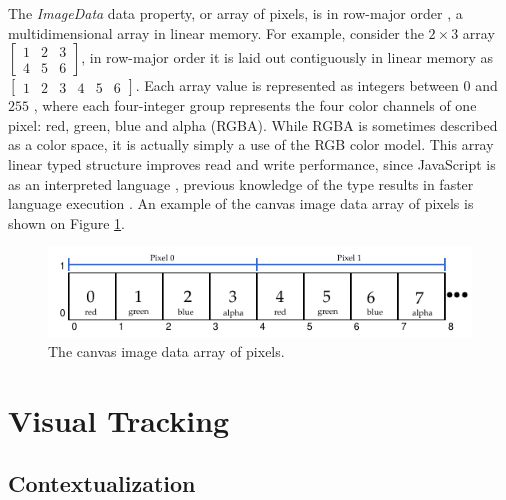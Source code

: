 The \textit{ImageData} data property, or array of pixels, is in row-major order \cite{Canvas2013,MDN2013}, a multidimensional array in linear memory. For example, consider the $2\times3$ array $\begin{bmatrix}
1 & 2 & 3\\
4 & 5 & 6
\end{bmatrix}$, in row-major order it is laid out contiguously in linear memory as $\begin{bmatrix}
1 & 2 & 3 & 4 & 5 & 6
\end{bmatrix}$. Each array value is represented as integers between $0$ and $255$ \cite{Canvas2013,MDN2013}, where each four-integer group represents the four color channels of one pixel: red, green, blue and alpha (RGBA). While RGBA \cite{Gonzalez2007} is sometimes described as a color space, it is actually simply a use of the RGB \cite{Gonzalez2007} color model. This array linear typed structure improves read and write performance, since JavaScript \cite{International2009} is as an interpreted language \cite{International2009,MDN2013}, previous knowledge of the type results in faster language execution \cite{TypedArray2013,MDN2013}. An example of the canvas \cite{Canvas2013} image data array of pixels is shown on Figure \ref{figure:imagedata_array}.

\begin{figure}[!htb]
  \centering
  \includegraphics[width=\linewidth]{chapters/basic_concepts/imagedata_array.pdf}
  \caption{The canvas image data array of pixels.}
  \label{figure:imagedata_array}
\end{figure}



\section{Visual Tracking} %
\label{sec:basic_concepts:visual_tracking}

\subsection{Contextualization} %
\label{sub:basic_concepts:contextualization}


